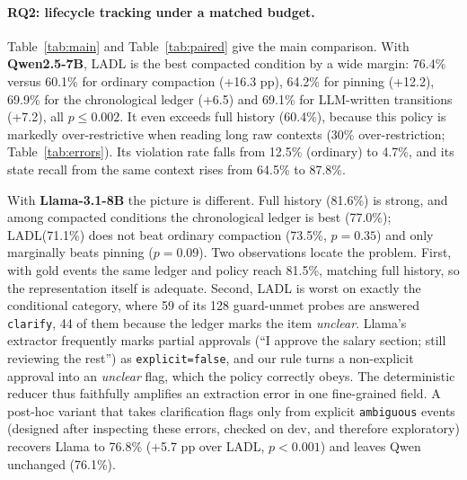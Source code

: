 \documentclass[11pt]{article}
\newcommand{\ours}{\textsc{LADL}\xspace}
\newcommand{\st}[1]{\texttt{#1}}
\begin{document}
\paragraph{RQ2: lifecycle tracking under a matched budget.} Table~\ref{tab:main} and Table~\ref{tab:paired} give the main comparison. With \textbf{Qwen2.5-7B}, \ours is the best compacted condition by a wide margin: 76.4\% versus 60.1\% for ordinary compaction (+16.3 pp), 64.2\% for pinning (+12.2), 69.9\% for the chronological ledger (+6.5) and 69.1\% for LLM-written transitions (+7.2), all $p\le0.002$. It even exceeds full history (60.4\%), because this policy is markedly over-restrictive when reading long raw contexts (30\% over-restriction; Table~\ref{tab:errors}). Its violation rate falls from 12.5\% (ordinary) to 4.7\%, and its state recall from the same context rises from 64.5\% to 87.8\%.

With \textbf{Llama-3.1-8B} the picture is different. Full history (81.6\%) is strong, and among compacted conditions the chronological ledger is best (77.0\%); \ours (71.1\%) does not beat ordinary compaction (73.5\%, $p{=}0.35$) and only marginally beats pinning ($p{=}0.09$). Two observations locate the problem. First, with gold events the same ledger and policy reach 81.5\%, matching full history, so the representation itself is adequate. Second, \ours is worst on exactly the conditional category, where 59 of its 128 guard-unmet probes are answered \st{clarify}, 44 of them because the ledger marks the item \emph{unclear}. Llama's extractor frequently marks partial approvals (``I approve the salary section; still reviewing the rest'') as \st{explicit=false}, and our rule turns a non-explicit approval into an \emph{unclear} flag, which the policy correctly obeys. The deterministic reducer thus faithfully amplifies an extraction error in one fine-grained field. A post-hoc variant that takes clarification flags only from explicit \st{ambiguous} events (designed after inspecting these errors, checked on dev, and therefore exploratory) recovers Llama to 76.8\% (+5.7 pp over \ours, $p{<}0.001$) and leaves Qwen unchanged (76.1\%).

\begin{table}[t]
\centering\small\setlength{\tabcolsep}{2.5pt}
\resizebox{\columnwidth}{!}{}
\caption{Error rates (\%) on the probes where each error can occur: violation, over-restriction, premature action, duplicate execution.}
\label{tab:errors}
\end{table}
\end{document}
